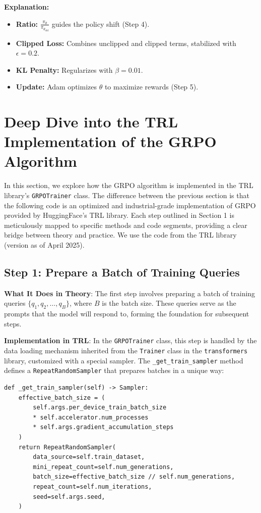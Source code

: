 \documentclass{article}
\begin{document}
\textbf{Explanation:}
\begin{itemize}
  \item \textbf{Ratio:} \( \frac{\pi_\theta}{\pi_{\theta_{\text{old}}}} \) guides the policy shift (Step 4).
  \item \textbf{Clipped Loss:} Combines unclipped and clipped terms, stabilized with \( \epsilon = 0.2 \).
  \item \textbf{KL Penalty:} Regularizes with \( \beta = 0.01 \).
  \item \textbf{Update:} Adam optimizes \( \theta \) to maximize rewards (Step 5).
\end{itemize}




\section{Deep Dive into the TRL Implementation of the GRPO Algorithm}

In this section, we explore how the GRPO algorithm is implemented in the TRL library’s \texttt{GRPOTrainer} class. The difference between the previous section is that the following code is an optimized and industrial-grade implementation of GRPO provided by HuggingFace's TRL library.
Each step outlined in Section 1 is meticulously mapped to specific methods and code segments, providing a clear bridge between theory and practice. We use the code from the TRL library (version as of April 2025).

\subsection*{Step 1: Prepare a Batch of Training Queries}

\textbf{What It Does in Theory}: The first step involves preparing a batch of training queries \( \{q_1, q_2, \dots, q_B\} \), where \( B \) is the batch size. These queries serve as the prompts that the model will respond to, forming the foundation for subsequent steps.

\textbf{Implementation in TRL}: In the \texttt{GRPOTrainer} class, this step is handled by the data loading mechanism inherited from the \texttt{Trainer} class in the \texttt{transformers} library, customized with a special sampler. The \texttt{\_get\_train\_sampler} method defines a \texttt{RepeatRandomSampler} that prepares batches in a unique way:

\begin{verbatim}
def _get_train_sampler(self) -> Sampler:
    effective_batch_size = (
        self.args.per_device_train_batch_size
        * self.accelerator.num_processes
        * self.args.gradient_accumulation_steps
    )
    return RepeatRandomSampler(
        data_source=self.train_dataset,
        mini_repeat_count=self.num_generations,
        batch_size=effective_batch_size // self.num_generations,
        repeat_count=self.num_iterations,
        seed=self.args.seed,
    )
\end{verbatim}
\end{document}
